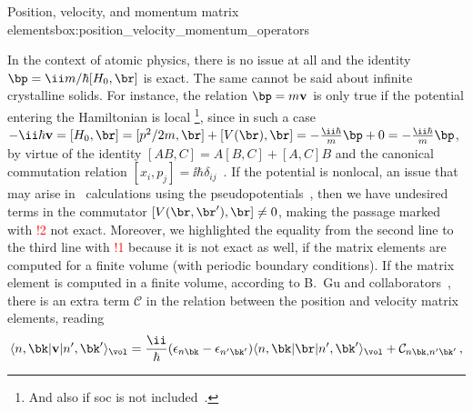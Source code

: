 \begin{mybox}{Position, velocity, and momentum matrix elements}{box:position_velocity_momentum_operators}

In the context of atomic physics, there is no issue at all and the identity $\bp = \ii m/\hbar [H_0,\br]$ is exact.
The same cannot be said about infinite crystalline solids.
For instance, the relation $\bp = m \mathbf{v}$ is only true if the potential entering the Hamiltonian is local \footnote{And also if \gls{soc} is not  included~\cite{Esteve_PhD}.}, since in such a case $-\ii \hbar \mathbf{v} = [H_0,\br] = [p^2/2m,\br] + [V(\br),\br] = - \frac{\ii \hbar}{m}\bp + 0 = - \frac{\ii \hbar}{m} \bp$, by virtue of the identity $[AB,C] = A[B,C] + [A,C] B$ and the canonical commutation relation $[x_i,p_j] = \ii \hbar \delta_{i j}$~\cite{Griffiths_2023}.
If the potential is nonlocal, an issue that may arise in \abinit~calculations using the pseudopotentials~\cite{Martin_2004}, then we have undesired terms in the commutator $[V(\br,\br'),\br] \neq 0$, making the passage marked with \textcolor{red}{!2} not exact.
Moreover, we highlighted the equality from the second line to the third line with \textcolor{red}{!1} because it is not exact as well, if the matrix elements are computed for a finite volume (with periodic boundary conditions).
If the matrix element is computed in a finite volume, according to B.~Gu and collaborators~\cite{Gu_2013}, there is an extra term $\mathcal{C}$ in the relation between the position and velocity matrix elements, reading
\vspace{-0.3cm}
\begin{equation}
    \langle n,\bk|\mathbf{v}|n',\bk'\rangle_{\vol} = \frac{\ii}{\hbar} (\epsilon_{n \bk} - \epsilon_{n' \bk'}) \langle n,\bk|\br|n',\bk'\rangle_{\vol} + \mathcal{C}_{n \bk, n' \bk'}\,,
\end{equation}


\end{mybox}
